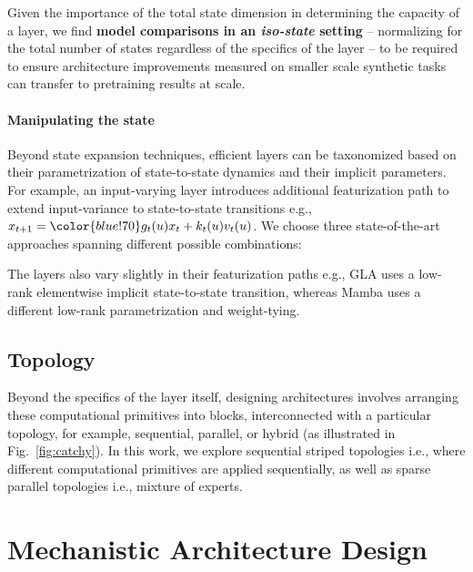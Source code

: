 Given the importance of the total state dimension in determining the capacity of a layer, we find \textbf{model comparisons in an \textit{iso-state} setting} -- normalizing for the total number of states regardless of the specifics of the layer -- to be required to ensure architecture improvements measured on smaller scale synthetic tasks can transfer to pretraining results at scale.

\paragraph{Manipulating the state}

Beyond state expansion techniques, efficient layers can be taxonomized based on their parametrization of state-to-state dynamics and their implicit parameters. For example, an input-varying layer introduces additional featurization path to extend input-variance to state-to-state transitions e.g., $x_{t+1} = {\color{blue!70}g_t(u)} x_{t} + k_{t}(u) v_t(u)$. We choose three state-of-the-art approaches spanning different possible combinations:

\begin{center}

\end{center}


The layers also vary slightly in their featurization paths e.g., GLA uses a low-rank elementwise implicit state-to-state transition, whereas Mamba uses a different low-rank parametrization and weight-tying.

\subsection{Topology}

Beyond the specifics of the layer itself, designing architectures involves arranging these computational primitives into blocks, interconnected with a particular topology, for example, sequential, parallel, or hybrid (as illustrated in Fig.~\ref{fig:catchy}). In this work, we explore sequential striped topologies i.e., where different computational primitives are applied sequentially, as well as sparse parallel topologies i.e., mixture of experts.

\section{Mechanistic Architecture Design}
\label{mechdes}

